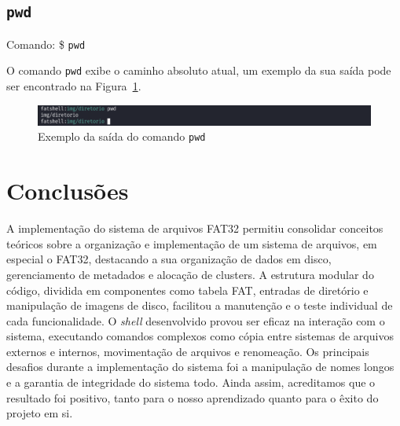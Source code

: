 \documentclass[
    12pt,				%
    oneside,   	        %
    a4paper,			%
    english,			%
    french,				%
    spanish,			%
    brazil,				%
    ]{pacotes/abntex2}
\begin{document}

\subsection{\texttt{pwd}}
\label{subsec:pwd}
Comando: \$ \texttt{pwd}

O comando \texttt{pwd} exibe o caminho absoluto atual, um exemplo da sua saída pode ser encontrado na Figura~\ref{fig:pwd}.

\begin{figure}[H]
    \centering
    \includegraphics[width=450pt]{figuras/resultados/19-pwd.PNG}
    \caption{Exemplo da saída do comando \texttt{pwd}}
    \label{fig:pwd}
\end{figure}


\section{Conclusões}
\label{sec:conclusoes}
A implementação do sistema de arquivos FAT32 permitiu consolidar conceitos teóricos sobre a organização e implementação de um sistema de arquivos, em especial o FAT32, destacando a sua organização de dados em disco, gerenciamento de metadados e alocação de clusters. A estrutura modular do código, dividida em componentes como tabela FAT, entradas de diretório e manipulação de imagens de disco, facilitou a manutenção e o teste individual de cada funcionalidade. O \textit{shell} desenvolvido provou ser eficaz na interação com o sistema, executando comandos complexos como cópia entre sistemas de arquivos externos e internos, movimentação de arquivos e renomeação. Os principais desafios durante a implementação do sistema foi a manipulação de nomes longos e a garantia de integridade do sistema todo. Ainda assim, acreditamos que o resultado foi positivo, tanto para o nosso aprendizado quanto para o êxito do projeto em si.

\postextual
\renewcommand{\bibsection}{%
\section{\bibname}
\bibmark
\prebibhook}


\end{document}

